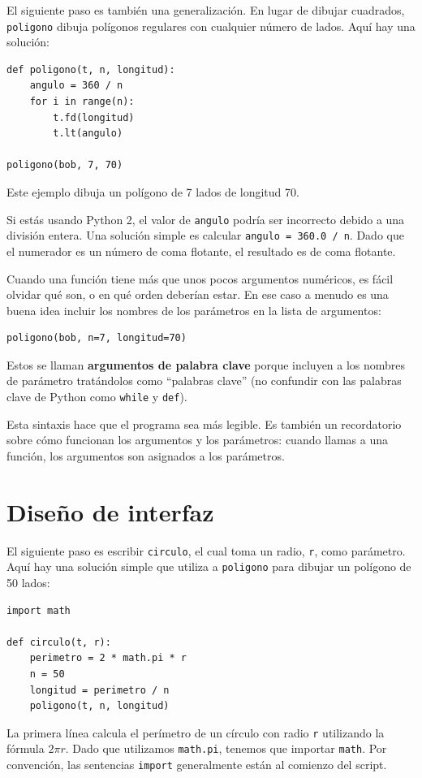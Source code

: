 \documentclass[10pt]{book}
\begin{document}
El siguiente paso es también una generalización.  En lugar de dibujar
cuadrados, {\tt poligono} dibuja polígonos regulares con cualquier número de
lados.  Aquí hay una solución:

\begin{verbatim}
def poligono(t, n, longitud):
    angulo = 360 / n
    for i in range(n):
        t.fd(longitud)
        t.lt(angulo)

poligono(bob, 7, 70)
\end{verbatim}
%
Este ejemplo dibuja un polígono de 7 lados de longitud 70.

Si estás usando Python 2, el valor de {\tt angulo} podría ser incorrecto
debido a una división entera.  Una solución simple es calcular
{\tt angulo = 360.0 / n}.  Dado que el numerador es un número de
coma flotante, el resultado es de coma flotante.

Cuando una función tiene más que unos pocos argumentos numéricos, es fácil
olvidar qué son, o en qué orden deberían estar.  En ese caso
a menudo es una buena idea incluir los nombres de los parámetros en la
lista de argumentos:

\begin{verbatim}
poligono(bob, n=7, longitud=70)
\end{verbatim}
%
Estos se llaman {\bf argumentos de palabra clave} porque incluyen
a los nombres de parámetro tratándolos como ``palabras clave'' (no confundir con
las palabras clave de Python como {\tt while} y {\tt def}).

Esta sintaxis hace que el programa sea más legible.  Es también un recordatorio
sobre cómo funcionan los argumentos y los parámetros: cuando llamas a una función, los
argumentos son asignados a los parámetros.


\section{Diseño de interfaz}

El siguiente paso es escribir {\tt circulo}, el cual toma un radio,
{\tt r}, como parámetro.  Aquí hay una solución simple que utiliza a
{\tt poligono} para dibujar un polígono de 50 lados:

\begin{verbatim}
import math

def circulo(t, r):
    perimetro = 2 * math.pi * r
    n = 50
    longitud = perimetro / n
    poligono(t, n, longitud)
\end{verbatim}
%
La primera línea calcula el perímetro de un círculo con radio
{\tt r} utilizando la fórmula $2 \pi r$.  Dado que utilizamos {\tt math.pi},
tenemos que importar {\tt math}.  Por convención, las sentencias {\tt import}
generalmente están al comienzo del script.
\end{document}
